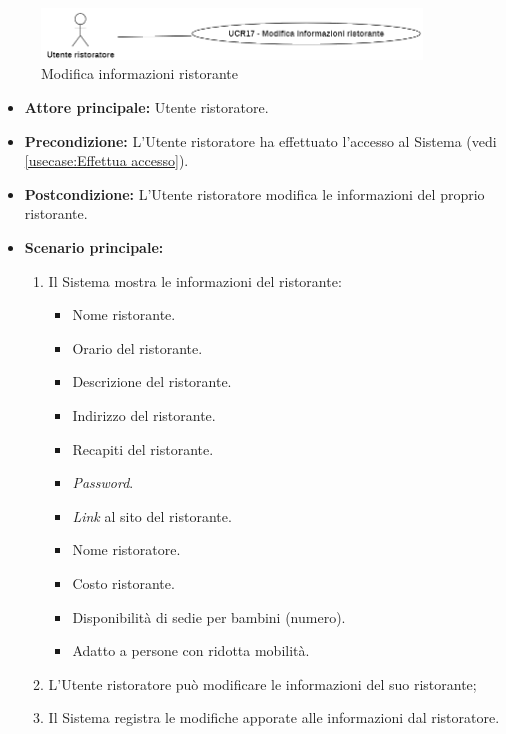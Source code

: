 \label{usecase:Modifica informazioni ristorante}

\begin{figure}[h]
	\centering
	\includegraphics[width=0.9\textwidth]{./uml/UCR17.png} 
	\caption{Modifica informazioni ristorante}
	\label{fig:UCR17}
  \end{figure}

\begin{itemize}
	\item \textbf{Attore principale:} Utente ristoratore.

	\item \textbf{Precondizione:} L'Utente ristoratore ha effettuato l'accesso al Sistema (vedi \autoref{usecase:Effettua accesso}).

	\item \textbf{Postcondizione:} L'Utente ristoratore modifica le informazioni del proprio ristorante.


	\item \textbf{Scenario principale:}
	      \begin{enumerate}

		      \item Il Sistema mostra le informazioni del ristorante:
		      \begin{itemize}
                \item Nome ristorante.
                \item Orario del ristorante.
                \item Descrizione del ristorante.
                \item Indirizzo del ristorante.
                \item Recapiti del ristorante.
                \item \textit{Password}. 
                \item \textit{Link} al sito del ristorante.
                \item Nome ristoratore.
                \item Costo ristorante.
                \item Disponibilità di sedie per bambini (numero).
                \item Adatto a persone con ridotta mobilità.
              \end{itemize}

		      \item L'Utente ristoratore può modificare le informazioni del suo ristorante;
		      \item Il Sistema registra le modifiche apporate alle informazioni dal ristoratore.

	      \end{enumerate}
\end{itemize}
